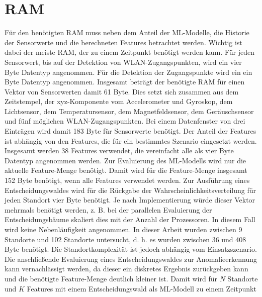 \newpage
\section{RAM}
Für den benötigten RAM muss neben dem Anteil der ML-Modelle, die Historie der Sensorwerte und die berechneten Features betrachtet werden.
Wichtig ist dabei der meiste RAM, der zu einem Zeitpunkt benötigt werden kann.
\newline
\newline
Für jeden Sensorwert, bis auf der Detektion von WLAN-Zugangspunkten, wird ein vier Byte Datentyp angenommen.
Für die Detektion der Zugangspunkte wird ein ein Byte Datentyp angenommen.
Insgesamt beträgt der benötigte RAM für einen Vektor von Sensorwerten damit 61 Byte.
\newline
\newline
Dies setzt sich zusammen aus dem Zeitstempel, der xyz-Komponente vom Accelerometer und Gyroskop, dem Lichtsensor,
dem Temperatursensor, dem Magnetfeldsensor, dem Geräuschsensor und fünf möglichen WLAN-Zugangspunkten.
Bei einem Datenfenster von drei Einträgen wird damit 183 Byte für Sensorwerte benötigt.
\newline
\newline
Der Anteil der Features ist abhängig von den Features, die für ein bestimmtes Szenario eingesetzt werden.
Insgesamt werden 38 Features verwendet, die vereinfacht alle als vier Byte Datentyp angenommen werden.
Zur Evaluierung des ML-Modells wird nur die aktuelle Feature-Menge benötigt.
Damit wird für die Feature-Menge insgesamt 152 Byte benötigt, wenn alle Features verwendet werden.
\newline
\newline
Zur Ausführung eines Entscheidungswaldes wird für die Rückgabe der Wahrscheinlichkeitsverteilung für jeden Standort vier Byte benötigt.
Je nach Implementierung würde dieser Vektor mehrmals benötigt werden, z. B. bei der parallelen Evaluierung der Entscheidungsbäume skaliert dies mit der Anzahl der Prozessoren.
In diesem Fall wird keine Nebenläufigkeit angenommen.
In dieser Arbeit wurden zwischen 9 Standorte und 102 Standorte untersucht, d. h. es wurden zwischen 36 und 408 Byte benötigt.
Die Standortkomplexität ist jedoch abhängig vom Einsatzszenario.
Die anschließende Evaluierung eines Entscheidungswaldes zur Anomalieerkennung kann vernachlässigt werden,
da dieser ein diskretes Ergebnis zurückgeben kann und die benötigte Feature-Menge deutlich kleiner ist.
Damit wird für $N$ Standorte und $K$ Features mit einem Entscheidungswald als ML-Modell zu einem Zeitpunkt
